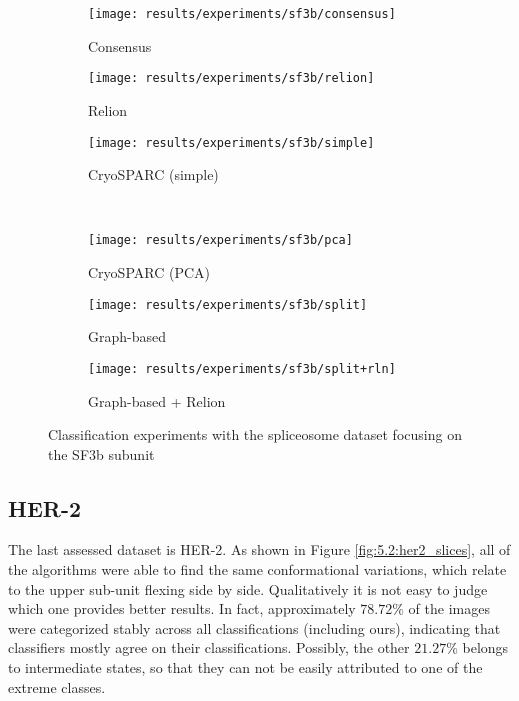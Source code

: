 \documentclass[../main.tex]{subfiles}
\begin{document}
\begin{figure}[hbp]
    \centering
    \begin{subfigure}[b]{0.3\textwidth}
         \centering
         \texttt{[image: results/experiments/sf3b/consensus]}
         \caption{Consensus}
    \end{subfigure}
    \begin{subfigure}[b]{0.3\textwidth}
         \centering
         \texttt{[image: results/experiments/sf3b/relion]}
         \caption{Relion}
    \end{subfigure}
    \begin{subfigure}[b]{0.3\textwidth}
         \centering
         \texttt{[image: results/experiments/sf3b/simple]}
         \caption{CryoSPARC (simple)}
    \end{subfigure}\\
    \vspace{1em}
    \begin{subfigure}[b]{0.3\textwidth}
         \centering
         \texttt{[image: results/experiments/sf3b/pca]}
         \caption{CryoSPARC (PCA)}
    \end{subfigure}
    \begin{subfigure}[b]{0.3\textwidth}
         \centering
         \texttt{[image: results/experiments/sf3b/split]}
         \caption{Graph-based}
    \end{subfigure}
    \begin{subfigure}[b]{0.3\textwidth}
         \centering
         \texttt{[image: results/experiments/sf3b/split+rln]}
         \caption{Graph-based + Relion}
    \end{subfigure}
    \caption{Classification experiments with the spliceosome dataset focusing on the SF3b subunit}
    \label{fig:5.2:sf3b_slices}
\end{figure}


\subsection{HER-2}
The last assessed dataset is HER-2. As shown in Figure \ref{fig:5.2:her2_slices}, all of the algorithms were able to find the same conformational variations, which relate to the upper sub-unit flexing side by side. Qualitatively it is not easy to judge which one provides better results. In fact, approximately $78.72 \si{\percent}$ of the images were categorized stably across all classifications (including ours), indicating that classifiers mostly agree on their classifications. Possibly, the other $21.27 \si{\percent}$ belongs to intermediate states, so that they can not be easily attributed to one of the extreme classes.
\end{document}
